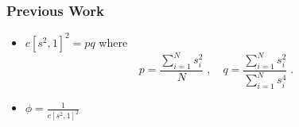 \begin{frame} \frametitle{Previous Work}
  \begin{itemize}
   \item $ c[s^2,1]^2 = \textit{pq}$ where 
\begin{equation}
\label{eq:pq}
p=\frac{\displaystyle \sum_{i=1}^N s_i^2}{\displaystyle N}\;,\quad q=\frac{\displaystyle \sum_{i=1}^N s_i^2}{\displaystyle \sum_{i=1}^N s_i^4}\;.
\end{equation}

   \item $\phi = \frac{1}{c[s^2,1]^2}$
  \end{itemize}

\end{frame}







 

